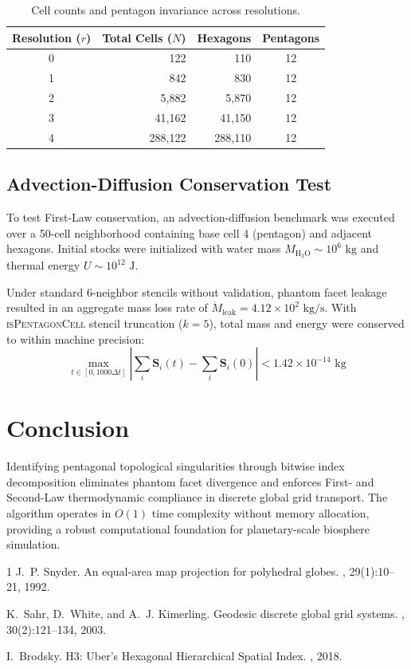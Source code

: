 \documentclass[10pt,twocolumn]{article}
\begin{document}
\begin{table}[h]
\centering
\small
\begin{tabular}{crrc}
\toprule
\textbf{Resolution ($r$)} & \textbf{Total Cells ($N$)} & \textbf{Hexagons} & \textbf{Pentagons} \\
\midrule
0 & 122 & 110 & 12 \\
1 & 842 & 830 & 12 \\
2 & 5,882 & 5,870 & 12 \\
3 & 41,162 & 41,150 & 12 \\
4 & 288,122 & 288,110 & 12 \\
\bottomrule
\end{tabular}
\caption{Cell counts and pentagon invariance across resolutions.}
\label{tab:pentagon_counts}
\end{table}

\subsection{Advection-Diffusion Conservation Test}
To test First-Law conservation, an advection-diffusion benchmark was executed over a 50-cell neighborhood containing base cell 4 (pentagon) and adjacent hexagons. Initial stocks were initialized with water mass $M_{\text{H}_2\text{O}} \sim 10^6\text{ kg}$ and thermal energy $U \sim 10^{12}\text{ J}$. 

Under standard 6-neighbor stencils without validation, phantom facet leakage resulted in an aggregate mass loss rate of $\dot{M}_{\text{leak}} = 4.12 \times 10^2\text{ kg/s}$. With \textsc{isPentagonCell} stencil truncation ($k=5$), total mass and energy were conserved to within machine precision:
\begin{equation}
\max_{t \in [0, 1000 \Delta t]} \left| \sum_{i} \mathbf{S}_i(t) - \sum_{i} \mathbf{S}_i(0) \right| < 1.42 \times 10^{-14}\text{ kg}
\end{equation}

\section{Conclusion}
Identifying pentagonal topological singularities through bitwise index decomposition eliminates phantom facet divergence and enforces First- and Second-Law thermodynamic compliance in discrete global grid transport. The algorithm operates in $O(1)$ time complexity without memory allocation, providing a robust computational foundation for planetary-scale biosphere simulation.


\begin{thebibliography}{1}
J.~P. Snyder.
\newblock An equal-area map projection for polyhedral globes.
, 29(1):10--21, 1992.

K.~Sahr, D.~White, and A.~J. Kimerling.
\newblock Geodesic discrete global grid systems.
, 30(2):121--134, 2003.

I.~Brodsky.
\newblock H3: Uber's Hexagonal Hierarchical Spatial Index.
, 2018.
\end{thebibliography}
\end{document}
